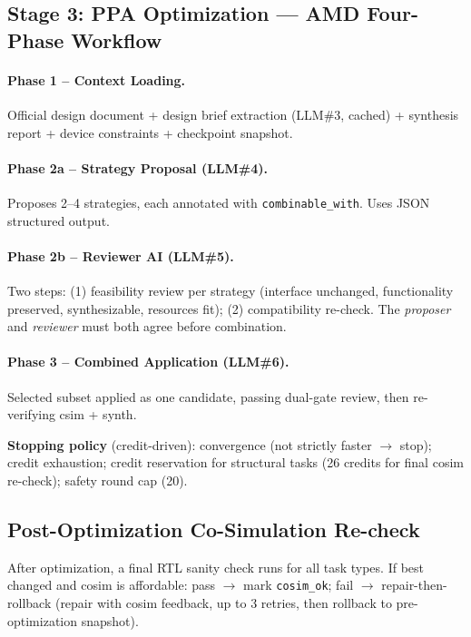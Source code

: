 \documentclass[10pt,conference,letterpaper]{IEEEtran}
\begin{document}
\subsection{Stage 3: PPA Optimization --- AMD Four-Phase Workflow}
\label{sec:optimize}

\paragraph{Phase 1 -- Context Loading.} Official design document + design brief extraction (LLM\#3, cached) + synthesis report + device constraints + checkpoint snapshot.

\paragraph{Phase 2a -- Strategy Proposal (LLM\#4).} Proposes 2--4 strategies, each annotated with \texttt{combinable\_with}. Uses JSON structured output.

\paragraph{Phase 2b -- Reviewer AI (LLM\#5).} Two steps: (1) feasibility review per strategy (interface unchanged, functionality preserved, synthesizable, resources fit); (2) compatibility re-check. The \emph{proposer} and \emph{reviewer} must both agree before combination.

\paragraph{Phase 3 -- Combined Application (LLM\#6).} Selected subset applied as one candidate, passing dual-gate review, then re-verifying csim + synth.

\textbf{Stopping policy} (credit-driven): convergence (not strictly faster $\to$ stop); credit exhaustion; credit reservation for structural tasks (26 credits for final cosim re-check); safety round cap (20).

\subsection{Post-Optimization Co-Simulation Re-check}
\label{sec:cosim-recheck}

After optimization, a final RTL sanity check runs for all task types. If best changed and cosim is affordable: pass $\to$ mark \texttt{cosim\_ok}; fail $\to$ repair-then-rollback (repair with cosim feedback, up to 3 retries, then rollback to pre-optimization snapshot).
\end{document}
